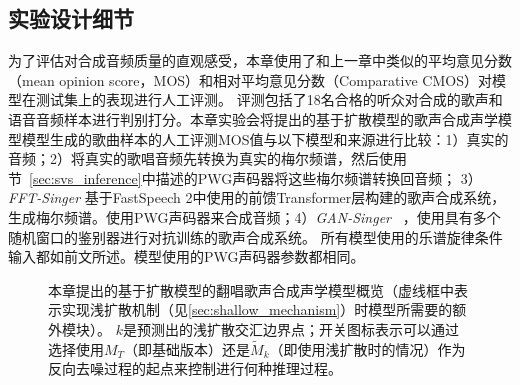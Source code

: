 \subsection{实验设计细节}
为了评估对合成音频质量的直观感受，本章使用了和上一章中类似的平均意见分数（mean opinion score，MOS）和相对平均意见分数（Comparative CMOS）对模型在测试集上的表现进行人工评测。 评测包括了18名合格的听众对合成的歌声和语音音频样本进行判别打分。本章实验会将提出的基于扩散模型的歌声合成声学模型模型生成的歌曲样本的人工评测MOS值与以下模型和来源进行比较：1）真实的音频；2）将真实的歌唱音频先转换为真实的梅尔频谱，然后使用节~\ref{sec:svs_inference}中描述的PWG声码器将这些梅尔频谱转换回音频；
3）\textit{FFT-Singer} 基于FastSpeech 2中使用的前馈Transformer层构建的歌声合成系统，生成梅尔频谱。使用PWG声码器来合成音频；4）\textit{GAN-Singer}
~\citep{wu2020adversarially}，使用具有多个随机窗口的鉴别器进行对抗训练的歌声合成系统。
所有模型使用的乐谱旋律条件输入都如前文所述。模型使用的PWG声码器参数都相同。
\begin{figure}[!ht]
    \centering
    \caption{本章提出的基于扩散模型的翻唱歌声合成声学模型概览（虚线框中表示实现浅扩散机制（见\ref{sec:shallow_mechanism}）时模型所需要的额外模块）。
		$k$是预测出的浅扩散交汇边界点；开关图标表示可以通过选择使用$M_T$（即基础版本）还是$\widetilde{M}_k$（即使用浅扩散时的情况）作为反向去噪过程的起点来控制进行何种推理过程。}
    \label{fig:main_fig}
\end{figure}
